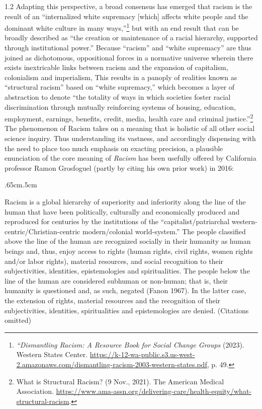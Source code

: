 \documentclass[../unravbook.tex]{subfiles}
\begin{document}
\begin{spacing}{1.2}
Adapting this perspective, a broad consensus has emerged that racism is the result of an ``internalized white supremacy [which] affects white people and the dominant white culture in many ways,''\footnote{\textit{``Dismantling Racism: A Resource Book for Social Change Groups} (2023). Western States Center. \url{https://k-12-wa-public.s3.us-west-2.amazonaws.com/dismantling-racism-2003-western-states.pdf}, p. 49.} but with an end result that can be broadly described as ``the creation or maintenance of a racial hierarchy, supported through institutional power.''  Because ``racism'' and ``white supremacy'' are thus joined  as dichotomous, oppositional forces in a normative universe wherein there exists inextricable links between racism and the expansion of capitalism, colonialism and imperialism,  This results in a panoply of realities known as ``structural racism'' based on ``white supremacy,'' which becomes a layer of abstraction to denote ``the totality of ways in which societies foster racial discrimination through mutually reinforcing systems of housing, education, employment, earnings, benefits, credit, media, health care and criminal justice.''\footnote{What is Structural Racism? (9 Nov., 2021). The American Medical Association. \url{https://www.ama-assn.org/delivering-care/health-equity/what-structural-racism}.} The phenomenon of Racism takes on a meaning that is holistic of all other social science inquiry. Thus understanding its vastness, and accordingly dispensing with the need to place too much emphasis on exacting precision, a plausible enunciation of the core meaning of \textit{Racism} has been usefully offered by California professor Ramon Grosfoguel (partly by citing his own prior work) in 2016:

\begin{adjustwidth}{.65cm}{.5cm}
    \begin{singlespace}
Racism is a global hierarchy of superiority and inferiority along the line of the human that have been politically, culturally and economically produced and reproduced for centuries by the institutions of the ``capitalist/patriarchal western-centric/Christian-centric modern/colonial world-system.'' The people classified above the line of the human are recognized socially in their humanity as human beings and, thus, enjoy access to rights (human rights, civil rights, women rights and/or labor rights), material resources, and social recognition to their subjectivities, identities, epistemologies and spiritualities. The people below the line of the human are considered subhuman or non-human; that is, their humanity is questioned and, as such, negated (Fanon 1967). In the latter case, the extension of rights, material resources and the recognition of their subjectivities, identities, spiritualities and epistemologies are denied. (Citations omitted)
    \end{singlespace}
\end{adjustwidth}


\end{spacing}
\end{document}
